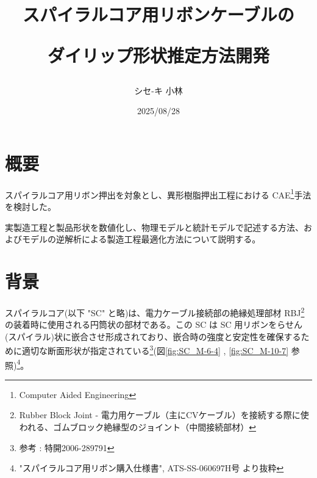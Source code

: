 \documentclass[report]{jlreq}
\begin{document}
\title{
スパイラルコア用リボンケーブルの

ダイリップ形状推定方法開発
}
\author{シセ-キ 小林}
\date{2025/08/28}
\maketitle

\chapter{概要}
スパイラルコア用リボン押出を対象とし、異形樹脂押出工程における CAE\footnote{Computer Aided Engineering}手法を検討した。

実製造工程と製品形状を数値化し、物理モデルと統計モデルで記述する方法、およびモデルの逆解析による製造工程最適化方法について説明する。

\chapter{背景}
スパイラルコア({\small 以下 "SC" と略})は、電力ケーブル接続部の絶縁処理部材 RBJ\footnote{Rubber Block Joint - 電力用ケーブル（主にCVケーブル）を接続する際に使われる、ゴムブロック絶縁型のジョイント（中間接続部材）} の装着時に使用される円筒状の部材である。この SC は SC 用リボンをらせん({\small スパイラル})状に嵌合させ形成されており、嵌合時の強度と安定性を確保するために適切な断面形状が指定されている\footnote{参考 : 特開2006-289791}({\small 図\ref{fig:SC_M-6-4} , \ref{fig:SC_M-10-7} 参照})\footnote{"スパイラルコア用リボン購入仕様書", ATS-SS-060697H号 より抜粋}。
\end{document}
